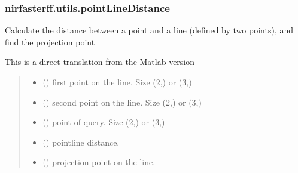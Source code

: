\documentclass[letterpaper,10pt,english]{sphinxmanual}
\begin{document}
\sphinxstepscope


\subsubsection{nirfasterff.utils.pointLineDistance}
\label{\detokenize{_autosummary/nirfasterff.utils.pointLineDistance:nirfasterff-utils-pointlinedistance}}\label{\detokenize{_autosummary/nirfasterff.utils.pointLineDistance::doc}}

\begin{fulllineitems}
\label{\detokenize{_autosummary/nirfasterff.utils.pointLineDistance:nirfasterff.utils.pointLineDistance}}
\pysigstartsignatures
{}
\pysigstopsignatures
\sphinxAtStartPar
Calculate the distance between a point and a line (defined by two points), and find the projection point

\sphinxAtStartPar
This is a direct translation  from the Matlab version
\begin{quote}\begin{description}
\begin{itemize}
\item {} 
\sphinxAtStartPar
{} () \textendash{} first point on the line. Size (2,) or (3,)

\item {} 
\sphinxAtStartPar
{} () \textendash{} second point on the line. Size (2,) or (3,)

\item {} 
\sphinxAtStartPar
{} () \textendash{} point of query. Size (2,) or (3,)

\end{itemize}

\sphinxAtStartPar
\begin{itemize}
\item {} 
\sphinxAtStartPar
{} () \textendash{} point\sphinxhyphen{}line distance.

\item {} 
\sphinxAtStartPar
{} () \textendash{} projection point on the line.

\end{itemize}


\end{description}\end{quote}

\end{fulllineitems}
\end{document}
